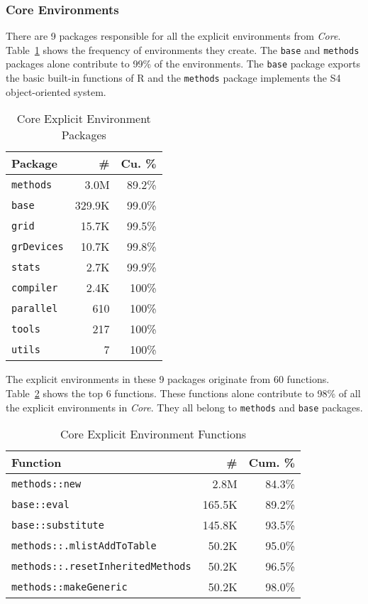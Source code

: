 \documentclass[10pt,review,sigplan,authorversion=true]{acmart}
\renewcommand{\c}[1]{\lstinline |#1|\xspace}
\begin{document}
\subsubsection{Core Environments}

There are 9 packages responsible for all the explicit environments from
\emph{Core}. Table~\ref{table:core_explicit_pack} shows the frequency of
environments they create. The \c{base} and \c{methods} packages alone
contribute to 99\% of the environments. The \c{base} package exports the
basic built-in functions of R and the \c{methods} package implements the S4
object-oriented system.

\begin{table}[!h]
  \small
  \caption{Core Explicit Environment Packages} \label{table:core_explicit_pack}
  \centering
  \begin{tabular}{lrr}
    \toprule
    \textbf{Package}&\textbf{\#}&\textbf{Cu. \%}\\
    \midrule
    \c{methods}&3.0M&89.2\%\\
    \c{base}&329.9K&99.0\%\\
    \c{grid}&15.7K&99.5\%\\
    \c{grDevices}&10.7K&99.8\%\\
    \c{stats}&2.7K&99.9\%\\
    \c{compiler}&2.4K&100\%\\
    \c{parallel}&610&100\%\\
    \c{tools}&217&100\%\\
    \c{utils}&7&100\%\\
    \bottomrule
  \end{tabular}
\end{table}

The explicit environments in these 9 packages originate from 60 functions.
Table~\ref{table:core_explicit_fun} shows the top 6 functions. These functions
alone contribute to 98\% of all the explicit environments in \emph{Core}. They
all belong to \c{methods} and \c{base} packages.

\begin{table}[!h]
  \small
  \caption{Core Explicit Environment Functions} \label{table:core_explicit_fun}
  \centering
  \begin{tabular}{lrr}
    \toprule
    \textbf{Function}&\textbf{\#}&\textbf{Cum. \%}\\
    \midrule
    \c{methods::new}&2.8M&84.3\%\\
    \c{base::eval}&165.5K&89.2\%\\
    \c{base::substitute}&145.8K&93.5\%\\
    \c{methods::.mlistAddToTable}&50.2K&95.0\%\\
    \c{methods::.resetInheritedMethods}&50.2K&96.5\%\\
    \c{methods::makeGeneric}&50.2K&98.0\%\\
    \bottomrule
  \end{tabular}
\end{table}
\end{document}

